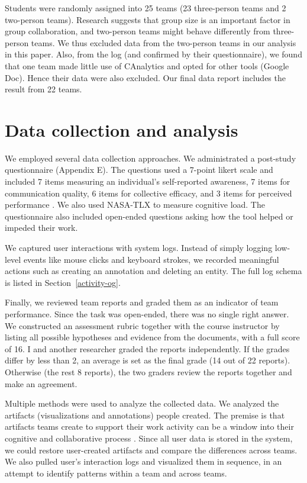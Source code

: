 Students were randomly assigned into 25 teams (23 three-person teams and 2
two-person teams). Research suggests that group size is an important factor in
group collaboration, and two-person teams might behave differently from
three-person teams. We thus excluded data from the two-person teams in our
analysis in this paper. Also, from the log (and confirmed by their
questionnaire), we found that one team made little use of CAnalytics and opted
for other tools (Google Doc). Hence their data were also excluded. Our final data report includes the result from 22 teams.

\section{Data collection and analysis}

We employed several data collection approaches. We administrated a post-study
questionnaire (Appendix E). The questions used a 7-point likert scale and included 7 items measuring an individual's
self-reported awareness, 7 items for
communication quality, 6 items for collective efficacy, and 3 items for perceived performance \citep{Convertino2011}. We also used NASA-TLX \citep{Hart1988} to measure cognitive load. The questionnaire
also included open-ended questions asking how the tool helped or impeded their
work. 

We captured user interactions with system logs. Instead of simply logging
low-level events like mouse clicks and keyboard strokes, we recorded meaningful actions such
as creating an annotation and deleting an entity. The full log schema is listed in Section~\ref{activity-og}.  

Finally, we reviewed team
reports and graded them as an indicator of team performance. Since the task was
open-ended, there was no single right answer. We constructed an assessment
rubric together with the course instructor by listing all possible hypotheses
and evidence from the documents, with a full score of 16. I and another researcher graded the reports independently. If the grades differ by
less than 2, an average is set as the final grade (14 out of 22 reports).
Otherwise (the rest 8 reports), the two graders review the reports together and
make an agreement.

Multiple methods were used to analyze the collected data. We analyzed the artifacts (visualizations and annotations) people created. The premise is that artifacts teams create to support their work activity can be a window into their cognitive and collaborative process \citep{Carroll2013}. Since all user data is stored in the system, we could restore user-created artifacts and compare the differences across teams. We also pulled user's interaction logs and visualized them in sequence, in an attempt to identify patterns within a team and across teams.

